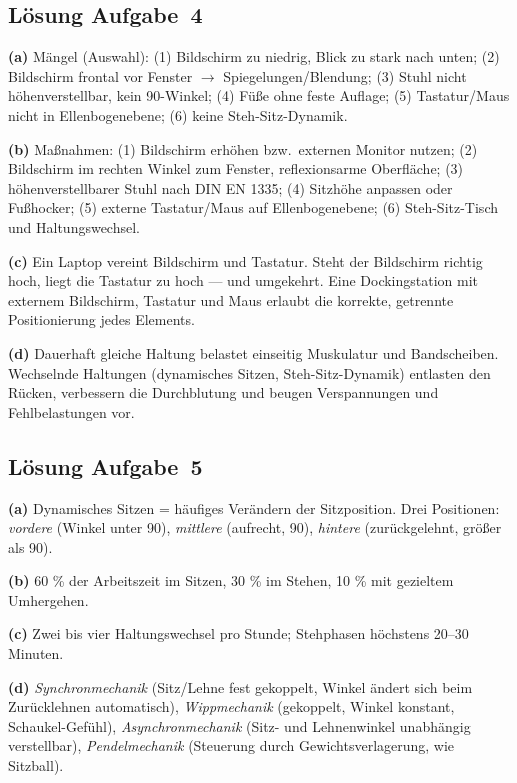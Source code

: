 \documentclass[11pt, a4paper]{article}
\begin{document}
\subsection*{Lösung Aufgabe~4}
\begin{loesung}
\textbf{(a)} Mängel (Auswahl): (1) Bildschirm zu niedrig, Blick zu stark nach unten;
(2) Bildschirm frontal vor Fenster $\to$ Spiegelungen/Blendung; (3) Stuhl nicht
höhenverstellbar, kein 90\textdegree-Winkel; (4) Füße ohne feste Auflage; (5) Tastatur/Maus
nicht in Ellenbogenebene; (6) keine Steh-Sitz-Dynamik.

\textbf{(b)} Maßnahmen: (1) Bildschirm erhöhen bzw.\ externen Monitor nutzen; (2) Bildschirm
im rechten Winkel zum Fenster, reflexionsarme Oberfläche; (3) höhenverstellbarer Stuhl nach
DIN EN 1335; (4) Sitzhöhe anpassen oder Fußhocker; (5) externe Tastatur/Maus auf
Ellenbogenebene; (6) Steh-Sitz-Tisch und Haltungswechsel.

\textbf{(c)} Ein Laptop vereint Bildschirm und Tastatur. Steht der Bildschirm richtig hoch,
liegt die Tastatur zu hoch --- und umgekehrt. Eine Dockingstation mit externem Bildschirm,
Tastatur und Maus erlaubt die korrekte, getrennte Positionierung jedes Elements.

\textbf{(d)} Dauerhaft gleiche Haltung belastet einseitig Muskulatur und Bandscheiben.
Wechselnde Haltungen (dynamisches Sitzen, Steh-Sitz-Dynamik) entlasten den Rücken,
verbessern die Durchblutung und beugen Verspannungen und Fehlbelastungen vor.
\end{loesung}

\subsection*{Lösung Aufgabe~5}
\begin{loesung}
\textbf{(a)} Dynamisches Sitzen = häufiges Verändern der Sitzposition. Drei Positionen:
\emph{vordere} (Winkel unter 90\textdegree), \emph{mittlere} (aufrecht, 90\textdegree),
\emph{hintere} (zurückgelehnt, größer als 90\textdegree).

\textbf{(b)} 60 \% der Arbeitszeit im Sitzen, 30 \% im Stehen, 10 \% mit gezieltem
Umhergehen.

\textbf{(c)} Zwei bis vier Haltungswechsel pro Stunde; Stehphasen höchstens 20--30 Minuten.

\textbf{(d)} \emph{Synchronmechanik} (Sitz/Lehne fest gekoppelt, Winkel ändert sich beim
Zurücklehnen automatisch), \emph{Wippmechanik} (gekoppelt, Winkel konstant, Schaukel-Gefühl),
\emph{Asynchronmechanik} (Sitz- und Lehnenwinkel unabhängig verstellbar),
\emph{Pendelmechanik} (Steuerung durch Gewichtsverlagerung, wie Sitzball).
\end{loesung}
\end{document}
